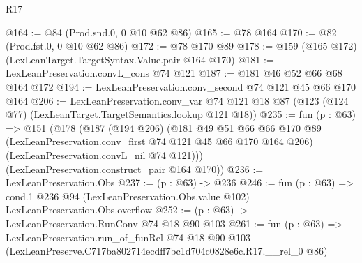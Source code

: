 \begin{lexlean}{R17}
\begin{coremodule}
@164 := @84 (Prod.snd.{0, 0} @10 @62 @86)
@165 := @78 @164
@170 := @82 (Prod.fst.{0, 0} @10 @62 @86)
@172 := @78 @170 @89
@178 := @159 (@165 @172) (LexLeanTarget.TargetSyntax.Value.pair @164 @170)
@181 := LexLeanPreservation.convL_cons @74 @121
@187 := @181 @46 @52 @66 @68 @164 @172
@194 := LexLeanPreservation.conv_second @74 @121 @45 @66 @170 @164
@206 := LexLeanPreservation.conv_var
    @74
    @121
    @18
    @87
    (@123 (@124 @77) (LexLeanTarget.TargetSemantics.lookup @121 @18))
@235 := fun (p : @63) =>
  @151
    (@178
      (@187
        (@194 @206)
        (@181
          @49
          @51
          @66
          @66
          @170
          @89
          (LexLeanPreservation.conv_first @74 @121 @45 @66 @170 @164 @206)
          (LexLeanPreservation.convL_nil @74 @121)))
      (LexLeanPreservation.construct_pair @164 @170))
@236 := LexLeanPreservation.Obs
@237 := (p : @63) -> @236
@246 := fun (p : @63) =>
  cond.{1} @236 @94 (LexLeanPreservation.Obs.value @102) LexLeanPreservation.Obs.overflow
@252 := (p : @63) -> LexLeanPreservation.RunConv @74 @18 @90 @103
@261 := fun (p : @63) =>
  LexLeanPreservation.run_of_funRel
    @74
    @18
    @90
    @103
    (LexLeanPreserve.C717ba802714ecdff7bc1d704c0828e6c.R17.__rel_0 @86)
\end{coremodule}
\end{lexlean}
